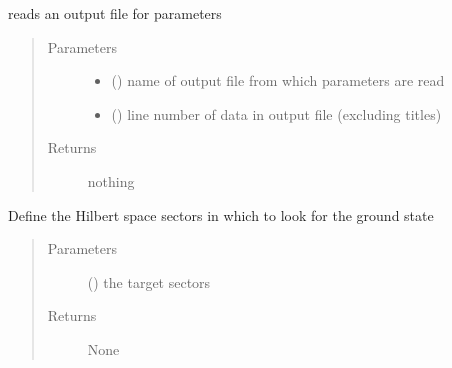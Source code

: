 \documentclass[letterpaper,10pt,english]{sphinxmanual}
\begin{document}
\begin{fulllineitems}
\label{\detokenize{functions:pyqcm.set_params_from_file}}
\sphinxAtStartPar
reads an output file for parameters
\begin{quote}\begin{description}
\item[{Parameters}] \leavevmode\begin{itemize}
\item {} 
\sphinxAtStartPar
{} () \textendash{} name of output file from which parameters are read

\item {} 
\sphinxAtStartPar
{} () \textendash{} line number of data in output file (excluding titles)

\end{itemize}

\item[{Returns}] \leavevmode
\sphinxAtStartPar
nothing

\end{description}\end{quote}

\end{fulllineitems}


\begin{fulllineitems}
\label{\detokenize{functions:pyqcm.set_target_sectors}}
\sphinxAtStartPar
Define the Hilbert space sectors in which to look for the ground state
\begin{quote}\begin{description}
\item[{Parameters}] \leavevmode
\sphinxAtStartPar
{} (\sphinxstyleliteralemphasis{\sphinxupquote{{[}}}\sphinxstyleliteralemphasis{\sphinxupquote{{]}}}) \textendash{} the target sectors

\item[{Returns}] \leavevmode
\sphinxAtStartPar
None

\end{description}\end{quote}

\end{fulllineitems}
\end{document}
